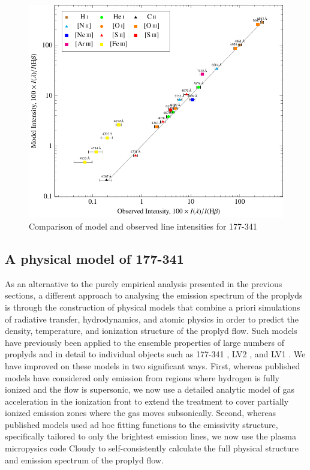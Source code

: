 \documentclass[useAMS,usenatbib]{mn2e}
\begin{document}
\addtocounter{section}{6}
\addtocounter{subsection}{2}
\addtocounter{table}{5}
\addtocounter{figure}{9}


\begin{figure}
  \centering
  \includegraphics{ratios-figure-figure0}
  \caption{Comparison of model and observed line intensities for 177-341}
  \label{fig:model}
\end{figure}

\subsection{A physical model of 177-341}
As an alternative to the purely empirical analysis presented in the previous sections, a different approach to analysing the emission spectrum of the proplyds is through the construction of physical models that combine a priori simulations of radiative transfer, hydrodynamics, and atomic physics in order to predict the density, temperature, and ionization structure of the proplyd flow.  
Such models have previously been applied to the ensemble properties of large numbers of proplyds \citep*{1998ApJ...499..758J, 1998AJ....116..322H} and in detail to individual objects such as 177-341 \citep{1999AJ....118.2350H}, LV2 \citep{2002ApJ...566..315H}, and LV1 \citep{2002ApJ...570..222G}. 
We have improved on these models in two significant ways.
First, whereas published models have considered only emission from regions where hydrogen is fully ionized and the flow is supersonic, we now use a detailed analytic model of gas acceleration in the ionization front \citep{2005ApJ...621..328H} to extend the treatment to cover partially ionized emission zones where the gas moves subsonically. 
Second, whereas published models used ad hoc fitting functions to the emissivity structure, specifically tailored to only the brightest emission lines, we now use the plasma micropysics code Cloudy \citep{1998PASP..110..761F} to self-consistently calculate the full physical structure and emission spectrum of the proplyd flow. 
\end{document}
